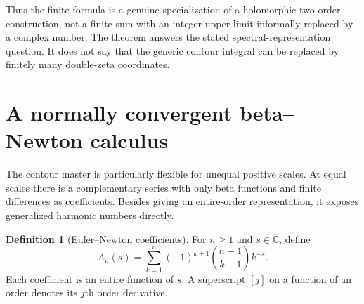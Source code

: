 \documentclass[11pt]{article}
\numberwithin{equation}{section}
\theoremstyle{definition}
\newtheorem{definition}[theorem]{Definition}
\newcommand{\C}{\mathbb C}
\begin{document}
Thus the finite formula is a genuine specialization of a holomorphic two-order construction, not a finite sum with an integer upper limit informally replaced by a complex number. The theorem answers the stated spectral-representation question. It does not say that the generic contour integral can be replaced by finitely many double-zeta coordinates.

\section{A normally convergent beta--Newton calculus}\label{sec:Newton}
The contour master is particularly flexible for unequal positive scales. At equal scales there is a complementary series with only beta functions and finite differences as coefficients. Besides giving an entire-order representation, it exposes generalized harmonic numbers directly.

\begin{definition}[Euler--Newton coefficients]
For $n\ge1$ and $s\in\C$, define
\begin{equation}\label{eq:A-def}
 A_n(s)=\sum_{k=1}^n(-1)^{k+1}\binom{n-1}{k-1}k^{-s}.
\end{equation}
Each coefficient is an entire function of $s$. A superscript $[j]$ on a function of an order denotes its $j$th order derivative.
\end{definition}
\end{document}
